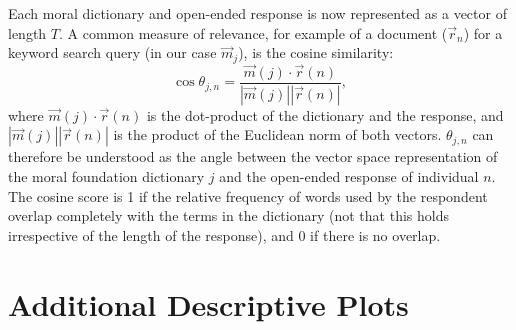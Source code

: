 \documentclass[12pt]{article}
\begin{document}
Each moral dictionary and open-ended response is now represented as a vector of length $T$. A common measure of relevance, for example of a document ($\vec{r}_n$) for a keyword search query (in our case $\vec{m}_j$), is the cosine similarity:
\begin{equation}
\cos\theta_{j,n}=\dfrac{\vec{m}(j)\cdotp\vec{r}(n)}{|\vec{m}(j)||\vec{r}(n)|},
\end{equation}
where $\vec{m}(j)\cdotp\vec{r}(n)$ is the dot-product of the dictionary and the response, and $|\vec{m}(j)||\vec{r}(n)|$ is the product of the Euclidean norm of both vectors. $\theta_{j,n}$ can therefore be understood as the angle between the vector space representation of the moral foundation dictionary $j$ and the open-ended response of individual $n$. The cosine score is 1 if the relative frequency of words used by the respondent overlap completely with the terms in the dictionary (not that this holds irrespective of the length of the response), and 0 if there is no overlap.


\clearpage
\section{Additional Descriptive Plots}\label{app:desc}
\renewcommand\thefigure{\thesection.\arabic{figure}}
\renewcommand\thetable{\thesection.\arabic{table}}
\setcounter{figure}{0}
\setcounter{table}{0}
\end{document}
